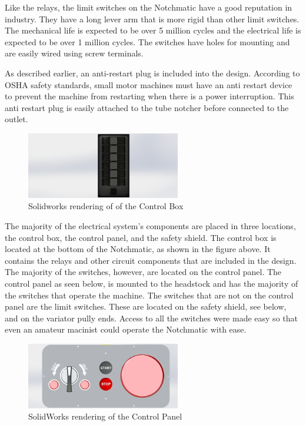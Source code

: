 Like the relays, the limit switches on the Notchmatic have a good reputation in industry. They have a long lever arm that is more rigid than other limit switches. The mechanical life is expected to be over 5 million cycles and the electrical life is expected to be over 1 million cycles. The switches have holes for mounting and are easily wired using screw terminals.

As described earlier, an anti-restart plug is included into the design. According to OSHA safety standards, small motor machines must have an anti restart device to prevent the machine from restarting when there is a power interruption. This anti restart plug is easily attached to the tube notcher before connected to the outlet.

\newpage
\begin{figure}[H]
    \centering
    \includegraphics[width=0.6\textwidth]{./fall-report pictures/Chapter2-MachineDescription/ControlBox}
    \caption{Solidworks rendering of of the Control Box}
    \label{fig:Control Boxl}
\end{figure} 

The majority of the electrical system's components are placed in three locations, the control box, the control panel, and the safety shield. The control box is located at the bottom of the Notchmatic, as shown in the figure above. It contains the relays and other circuit components that are included in the design. The majority of the switches, however, are located on the control panel. The control panel as seen below, is mounted to the headstock and has the majority of the switches that operate the machine. The switches that are not on the control panel are the limit switches. These are located on the safety shield, see below, and on the variator pully ends. Access to all the switches were made easy so that even an amateur macinist could operate the Notchmatic with ease. 

\begin{figure}[htp]
    \centering
    \includegraphics[width=0.6\textwidth]{./fall-report pictures/Chapter2-MachineDescription/ControlPanel}
    \caption{SolidWorks rendering of the Control Panel}
    \label{fig:Control Panel}
\end{figure}
 
